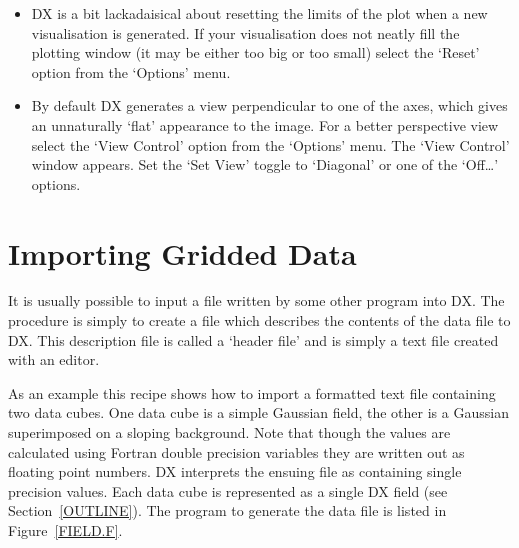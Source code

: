 \documentclass[twoside,11pt]{article}
\newcommand{\xlabel}[1]{}
\begin{document}
\begin{enumerate}
  \begin{itemize}

    \item DX is a bit lackadaisical about resetting the limits of the
     plot when a new visualisation is generated. If your visualisation
     does not neatly fill the plotting window (it may be either too big
     or too small) select the `Reset' option from the `Options' menu.

    \item By default DX generates a view perpendicular to one of the
     axes, which gives an unnaturally `flat' appearance to the image.
     For a better perspective view select the `View Control' option
     from the `Options' menu. The `View Control' window appears. Set the
     `Set View' toggle to `Diagonal' or one of the `Off\ldots' options.

  \end{itemize}

\end{enumerate}


\newpage
\section{\xlabel{IMP_GRID}\label{IMP_GRID}Importing Gridded Data}


It is usually possible to input a file written by some other program
into DX. The procedure is simply to create a file which describes the
contents of the data file to DX. This description file is called a
`header file' and is simply a text file created with an editor.

As an example this recipe shows how to import a formatted text file
containing two data cubes. One data cube is a simple Gaussian field,
the other is a Gaussian superimposed on a sloping background. Note that
though the values are calculated using Fortran double precision
variables they are written out as floating point numbers. DX interprets the
ensuing file as containing single precision values. Each data cube is
represented as a single DX field (see Section~\ref{OUTLINE}).
The program to generate the data file is listed in Figure~\ref{FIELD.F}.
\end{document}
